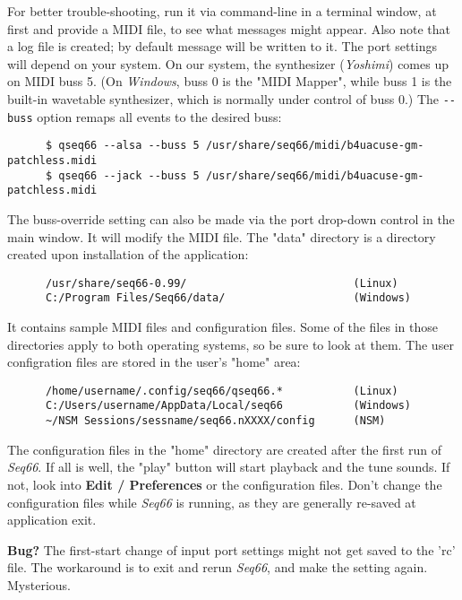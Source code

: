    For better trouble-shooting, run it via command-line in
   a terminal window, at first and provide a MIDI file, to
   see what messages might appear.
   Also note that a log file is created; by default message will be
   written to it.
   The port settings will depend on your system.
   On our system, the synthesizer (\textsl{Yoshimi}) comes up on MIDI buss 5.
   (On \textsl{Windows}, buss 0 is the "MIDI Mapper", while buss 1 is the
   built-in wavetable synthesizer, which is normally under control of buss 0.)
   The \texttt{-{}-buss} option remaps all events to the desired buss:

   \begin{verbatim}
      $ qseq66 --alsa --buss 5 /usr/share/seq66/midi/b4uacuse-gm-patchless.midi
      $ qseq66 --jack --buss 5 /usr/share/seq66/midi/b4uacuse-gm-patchless.midi
   \end{verbatim}

   The buss-override setting can also be made via the port drop-down control
   in the main window. It will modify the MIDI file.
   The "data" directory is a directory created upon installation of the
   application:

   \begin{verbatim}
      /usr/share/seq66-0.99/                          (Linux)
      C:/Program Files/Seq66/data/                    (Windows)
   \end{verbatim}

   It contains sample MIDI files and configuration files.
   Some of the files in those directories apply to both operating systems, so
   be sure to look at them.
   The user configration files are stored in the user's "home" area:

   \begin{verbatim}
      /home/username/.config/seq66/qseq66.*           (Linux)
      C:/Users/username/AppData/Local/seq66           (Windows)
      ~/NSM Sessions/sessname/seq66.nXXXX/config      (NSM)
   \end{verbatim}

   The configuration files in the "home" directory
   are created after the first run of \textsl{Seq66}.
   If all is well, the "play" button will start playback and the tune sounds.
   If not, look into \textbf{Edit / Preferences} or the configuration files.
   Don't change the configuration files while \textsl{Seq66} is running, as
   they are generally re-saved at application exit.

   \textbf{Bug?}
      The first-start change of input port settings might not get saved
      to the 'rc' file. The workaround is to exit and rerun
      \textsl{Seq66}, and make the setting again.
      Mysterious.

